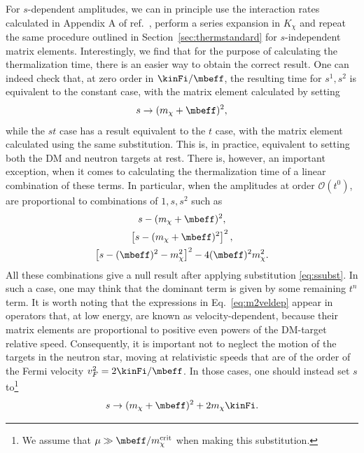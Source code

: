  For $s$-dependent amplitudes, we can in principle use the interaction rates calculated  in Appendix A of ref.~\cite{Bell:2020lmm_mar_ImprovedTreatmentDark}, perform a series expansion in $K_\chi$  and repeat the same procedure outlined in Section~\ref{sec:thermstandard} for $s$-independent matrix elements. Interestingly, we find that for the purpose of calculating the thermalization time, there is an easier way to obtain the correct result. One can indeed check that, at zero order in $\kinFi/\mbeff$, the resulting time for $s^1, s^2$ is equivalent to the constant case, with the matrix element calculated by setting 
\begin{equation}
    s\rightarrow (m_\chi+\mbeff)^2,
    \label{eq:ssubst}
\end{equation}
while the $s t $ case has a result equivalent to the $t$ case, with the matrix element calculated using the same substitution. This is, in practice, equivalent to setting both the DM and neutron targets at rest. There is, however, an important exception, when it comes to calculating the thermalization time of a linear combination of these terms. In particular, when the amplitudes at order $\mathcal{O}(t^0)$, are proportional to combinations of $1,s,s^2$ such as
\begin{gather}
s-(m_\chi+\mbeff)^2,\nonumber\\
\left[s-(m_\chi+\mbeff)^2\right]^2,\nonumber\\
\left[s-(\mbeff)^2-m_\chi^2\right]^2-4(\mbeff)^2 m_\chi^2.\label{eq:m2veldep}
\end{gather}
All these combinations give a null result after applying substitution \ref{eq:ssubst}. In such a case, one may think that the dominant term is given by some remaining $t^n$ term. It is worth noting that the expressions in  Eq.~\ref{eq:m2veldep}  appear in operators that, at low energy, are known as  velocity-dependent, because their matrix elements are proportional to positive even powers of the DM-target relative speed. Consequently, it is important not to neglect the motion of the targets in the neutron star, moving at relativistic speeds that are of the order of the Fermi velocity $v_F^2=2\kinFi/\mbeff$. In those cases, one should instead set $s$ to\footnote{We assume that $\mu\gg \mbeff/m_\chi^{\rm crit}$ when making this substitution.}
\begin{equation}
    s\rightarrow (m_\chi+\mbeff)^2+2m_\chi\kinFi.
    \label{eq:ssubstmu}
\end{equation}



